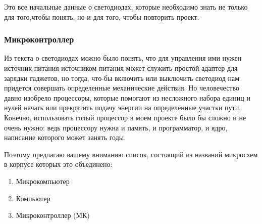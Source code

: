 \documentclass[a4paper, 12pt]{article}
\begin{document}
Это все начальные данные о светодиодах, которые необходимо знать не только для
того,чтобы понять, но и для того, чтобы повторить проект.

\newpage
\subsubsection{Микроконтроллер}

Из текста о светодиодах можно было понять, что для управления ими нужен
источник питания источником питания может служить простой адаптер для зарядки
гаджетов, но тогда, что-бы включить или выключить светодиод нам придется
совершать определенные механические действия. Но человечество давно изобрело
процессоры, которые помогают из несложного набора единиц и нулей начать или
прекратить подачу энергии на определенные участки пути. Конечно, использовать
голый процессор в моем проекте было бы сложно и не очень нужно: ведь процессору
нужна и память, и программатор, и ядро, написание которого может занять годы.

Поэтому предлагаю вашему вниманию список, состоящий из названий микросхем в
корпусе которых это объединено:

\begin{enumerate}
  \item   Микрокомпьютер
  \item   Компьютер
  \item   Микроконтроллер (МК)
\end{enumerate}
\end{document}
